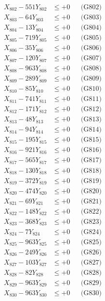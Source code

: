 \documentclass[a4paper,10pt]{article}
\begin{document}
{\begin{align}
X_{802} - 551Y_{802} &\leq +0 && \text{(G802)} \\
X_{803} - 64Y_{803} &\leq +0 && \text{(G803)} \\
X_{804} - 13Y_{804} &\leq +0 && \text{(G804)} \\
X_{805} - 719Y_{805} &\leq +0 && \text{(G805)} \\
X_{806} - 35Y_{806} &\leq +0 && \text{(G806)} \\
X_{807} - 120Y_{807} &\leq +0 && \text{(G807)} \\
X_{808} - 963Y_{808} &\leq +0 && \text{(G808)} \\
X_{809} - 289Y_{809} &\leq +0 && \text{(G809)} \\
X_{810} - 85Y_{810} &\leq +0 && \text{(G810)} \\
\allowbreak
X_{811} - 741Y_{811} &\leq +0 && \text{(G811)} \\
X_{812} - 171Y_{812} &\leq +0 && \text{(G812)} \\
X_{813} - 48Y_{813} &\leq +0 && \text{(G813)} \\
X_{814} - 94Y_{814} &\leq +0 && \text{(G814)} \\
X_{815} - 195Y_{815} &\leq +0 && \text{(G815)} \\
X_{816} - 921Y_{816} &\leq +0 && \text{(G816)} \\
X_{817} - 565Y_{817} &\leq +0 && \text{(G817)} \\
X_{818} - 130Y_{818} &\leq +0 && \text{(G818)} \\
X_{819} - 372Y_{819} &\leq +0 && \text{(G819)} \\
X_{820} - 474Y_{820} &\leq +0 && \text{(G820)} \\
\allowbreak
X_{821} - 69Y_{821} &\leq +0 && \text{(G821)} \\
X_{822} - 148Y_{822} &\leq +0 && \text{(G822)} \\
X_{823} - 368Y_{823} &\leq +0 && \text{(G823)} \\
X_{824} - 7Y_{824} &\leq +0 && \text{(G824)} \\
X_{825} - 963Y_{825} &\leq +0 && \text{(G825)} \\
X_{826} - 249Y_{826} &\leq +0 && \text{(G826)} \\
X_{827} - 103Y_{827} &\leq +0 && \text{(G827)} \\
X_{828} - 82Y_{828} &\leq +0 && \text{(G828)} \\
X_{829} - 963Y_{829} &\leq +0 && \text{(G829)} \\
X_{830} - 963Y_{830} &\leq +0 && \text{(G830)} \\

\end{align}}
\end{document}
